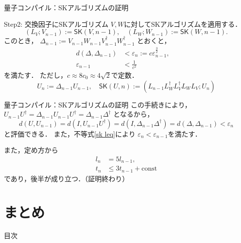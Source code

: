 \documentclass{beamer} %
\renewcommand{\epsilon}{\varepsilon}
\newcommand{\0}{\mathbf{0}}
\newcommand{\1}{\mathbf{1}}
\newcommand{\2}{\mathbf{2}}
\newcommand{\SK}{\mathsf{SK}}
\begin{document}
\begin{frame}{量子コンパイル：SKアルゴリズムの証明}
  \begin{exampleblock}
    {Step2: 交換因子にSKアルゴリズム}
    \(V,W\)に対してSKアルゴリズムを適用する．
    \[
      (L_V;V_{n-1}):=\SK(V,n-1),\quad
      (L_W;W_{n-1}):=\SK(W,n-1).
    \]
    このとき，
    \(\Delta_{n-1}:= V_{n-1}W_{n-1}
    V_{n-1}^\dagger W_{n-1}^\dagger\)
    とおくと，
    \begin{align}
      d(\Delta,\Delta_{n-1})
       & < \epsilon_n
      :=c\epsilon_{n-1}^\frac{3}{2},\quad \\
      \epsilon_{n-1}
       & <\frac{1}{c^{2}} \label{sk leq}
    \end{align}
    を満たす．
    ただし，\(c\approx 8c_0\approx 4\sqrt{2}\)で定数．
    \[
      U_{n}     := \Delta_{n-1} U_{n-1},\quad
      \SK(U,n)  :=(L_{n-1}L_W^\dagger L_V^\dagger L_W L_V;
      U_{n})
    \]
  \end{exampleblock}
\end{frame}

\begin{frame}{量子コンパイル：SKアルゴリズムの証明}
  この手続きにより，
  \(U_{n-1}U^\dagger = \Delta_{n-1}
  U_{n-1}U^\dagger = \Delta_{n-1} \Delta^\dagger\)
  となるから，
  \[
    d(U,U_{n-1})=d(I,U_{n-1}U^\dagger)
    =d(I,\Delta_{n-1}\Delta^\dagger)=d(\Delta,\Delta_{n-1})
    < \epsilon_n
  \]
  と評価できる．
  また，不等式\ref{sk leq}により
  \(\epsilon_n < \epsilon_{n-1}\)を満たす．

  また，定め方から
  \begin{align*}
    l_n & = 5l_{n-1},                  \\
    t_n & \leq 3t_{n-1} + \text{const}
  \end{align*}
  であり，後半が成り立つ．（証明終わり）
\end{frame}

\section{まとめ}
\begin{frame}[noframenumbering]{目次}
  \tableofcontents[currentsection]
\end{frame}
\end{document}
